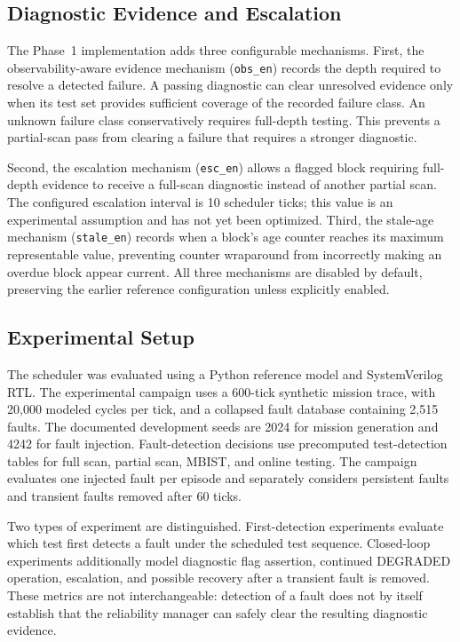 \documentclass[journal]{IEEEtran}
\begin{document}
\subsection{Diagnostic Evidence and Escalation}
The Phase~1 implementation adds three configurable mechanisms. First, the observability-aware evidence mechanism (\texttt{obs\_en}) records the depth required to resolve a detected failure. A passing diagnostic can clear unresolved evidence only when its test set provides sufficient coverage of the recorded failure class. An unknown failure class conservatively requires full-depth testing. This prevents a partial-scan pass from clearing a failure that requires a stronger diagnostic.

Second, the escalation mechanism (\texttt{esc\_en}) allows a flagged block requiring full-depth evidence to receive a full-scan diagnostic instead of another partial scan. The configured escalation interval is 10 scheduler ticks; this value is an experimental assumption and has not yet been optimized. Third, the stale-age mechanism (\texttt{stale\_en}) records when a block's age counter reaches its maximum representable value, preventing counter wraparound from incorrectly making an overdue block appear current. All three mechanisms are disabled by default, preserving the earlier reference configuration unless explicitly enabled.

\subsection{Experimental Setup}
The scheduler was evaluated using a Python reference model and SystemVerilog RTL. The experimental campaign uses a 600-tick synthetic mission trace, with 20,000 modeled cycles per tick, and a collapsed fault database containing 2,515 faults. The documented development seeds are 2024 for mission generation and 4242 for fault injection. Fault-detection decisions use precomputed test-detection tables for full scan, partial scan, MBIST, and online testing. The campaign evaluates one injected fault per episode and separately considers persistent faults and transient faults removed after 60 ticks.

Two types of experiment are distinguished. First-detection experiments evaluate which test first detects a fault under the scheduled test sequence. Closed-loop experiments additionally model diagnostic flag assertion, continued DEGRADED operation, escalation, and possible recovery after a transient fault is removed. These metrics are not interchangeable: detection of a fault does not by itself establish that the reliability manager can safely clear the resulting diagnostic evidence.
\end{document}
